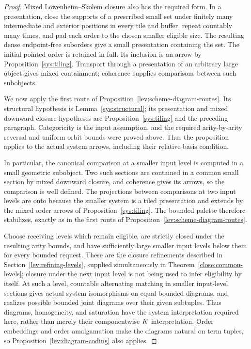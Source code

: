 \begin{proof}
Mixed L\"owenheim--Skolem closure also has the required form.
In a presentation, close the supports of a prescribed small set
under finitely many intermediate and exterior positions in every
tile and buffer, repeat countably many times, and pad each order
to the chosen smaller eligible size.  The resulting dense
endpoint-free suborders give a small presentation containing the
set.  The initial pointed order is retained in full.  Its inclusion
is an arrow by Proposition~\ref{sys:tiling}.  Transport through a
presentation of an arbitrary large object gives mixed containment;
coherence supplies comparisons between such subobjects.

We now apply the first route of
Proposition~\ref{lev:scheme-diagram-routes}.  Its structural
hypothesis is Lemma~\ref{sys:structural}; its presentation and mixed
downward-closure hypotheses are Proposition~\ref{sys:tiling} and
the preceding paragraph.  Categoricity is the input assumption,
and the required arity-by-arity reversal and uniform orbit bounds
were proved above.  Thus the proposition applies to the actual
system arrows, including their relative-basis condition.

In particular, the canonical comparison at a smaller input level
is computed in a small geometric subobject.  Two such sections
are contained in a common small section by mixed downward closure,
and coherence gives its arrows, so the comparison is well defined.
The projections between comparisons at two input levels are onto
because the smaller system is a tiled presentation and extends by
the mixed order arrows of Proposition~\ref{sys:tiling}.  The bounded
palette therefore stabilizes, exactly as in the first route of
Proposition~\ref{lev:scheme-diagram-routes}.

Choose receiving levels which remain eligible, are strictly closed
under the resulting arity bounds, and have sufficiently large
smaller input levels below them for every bounded request.
These are the closure refinements described in
Section~\ref{lev:refining-levels}, supplied simultaneously in
Theorem~\ref{close:common-levels}; closure under the next input
level is not being used to infer eligibility by itself.  At such a
level, countable alternating matching in smaller input-level
sections gives actual system isomorphisms on equal bounded
diagrams, and realizes possible bounded joint diagrams over their
given subtuples.  Thus diagrams, homogeneity, and saturation have
the system interpretation required here, rather than merely their
componentwise $K$ interpretation.  Order embeddings and order
amalgamation make the diagrams natural on term tuples, so
Proposition~\ref{lev:diagram-coding} also applies.


\end{proof}
